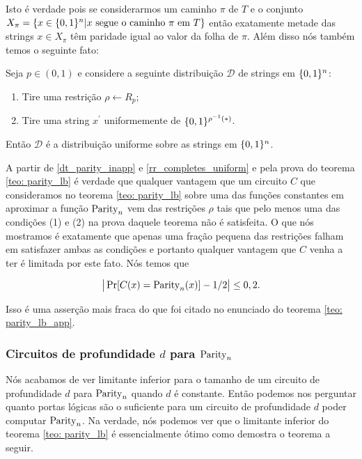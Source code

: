 Isto é verdade pois se considerarmos um caminho $\pi$ de $T$ e o conjunto $X_{\pi} = \{x \in \{0, 1\}^{n} \lvert x \text{ segue o caminho } \pi \text{ em } T\}$ então exatamente metade das strings $x \in X_{\pi}$ têm paridade igual ao valor da folha de $\pi$. Além disso nós também temos o seguinte fato:

\begin{fato} \label{rr_completes_uniform}

Seja $p \in (0, 1)$ e considere a seguinte distribuição $\mathcal{D}$ de strings em $\{0, 1\}^{n}$:

\begin{enumerate}

	\item Tire uma restrição $\rho \leftarrow R_{p}$;
	
	\item Tire uma string $x^{\prime}$ uniformemente de $\{0, 1\}^{\rho^{-1}(*)}$.


\end{enumerate}

Então $\mathcal{D}$ é a distribuição uniforme sobre as strings em $\{0, 1\}^{n}$.

\end{fato}

A partir de \ref{dt_parity_inapp} e \ref{rr_completes_uniform} e pela prova do teorema \ref{teo: parity_lb} é verdade que qualquer vantagem que um circuito $C$ que consideramos no teorema \ref{teo: parity_lb} sobre uma das funções constantes em aproximar a função $\text{Parity}_{n}$ vem das restrições $\rho$ tais que pelo menos uma das condições (1) e (2) na prova daquele teorema não é satisfeita. O que nós mostramos é exatamente que apenas uma fração pequena das restrições falham em satisfazer ambas as condições e portanto qualquer vantagem que $C$ venha a ter é limitada por este fato. Nós temos que

\begin{equation*}
	\big\lvert \Pr[C(x) = \text{Parity}_{n}(x)] - 1/2 \big\rvert \leq 0,2.
\end{equation*}

Isso é uma asserção mais fraca do que foi citado no enunciado do teorema \ref{teo: parity_lb_app}.

\subsubsection{Circuitos de profundidade $d$ para $\text{Parity}_{n}$}

Nós acabamos de ver limitante inferior para o tamanho de um circuito de profundidade $d$ para $\text{Parity}_{n}$ quando $d$ é constante. Então podemos nos perguntar quanto portas lógicas são o suficiente para um circuito de profundidade $d$ poder computar $\text{Parity}_{n}$. Na verdade, nós podemos ver que o limitante inferior do teorema \ref{teo: parity_lb} é essencialmente ótimo como demostra o teorema a seguir.

